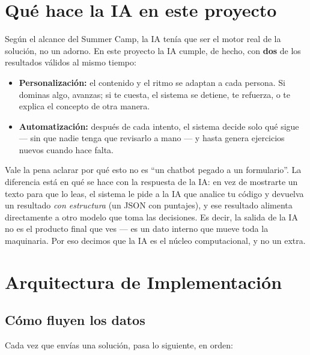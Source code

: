 \documentclass[11pt,letterpaper]{article}
\begin{document}
\newpage
\section{Qué hace la IA en este proyecto}

Según el alcance del Summer Camp, la IA tenía que ser el motor real de
la solución, no un adorno. En este proyecto la IA cumple, de hecho, con
\textbf{dos} de los resultados válidos al mismo tiempo:

\begin{itemize}[leftmargin=*]
  \item \textbf{Personalización:} el contenido y el ritmo se adaptan a
  cada persona. Si dominas algo, avanzas; si te cuesta, el sistema se
  detiene, te refuerza, o te explica el concepto de otra manera.
  \item \textbf{Automatización:} después de cada intento, el sistema
  decide solo qué sigue --- sin que nadie tenga que revisarlo a mano ---
  y hasta genera ejercicios nuevos cuando hace falta.
\end{itemize}

Vale la pena aclarar por qué esto no es ``un chatbot pegado a un
formulario''. La diferencia está en qué se hace con la respuesta de la
IA: en vez de mostrarte un texto para que lo leas, el sistema le pide a
la IA que analice tu código y devuelva un resultado \textit{con
estructura} (un JSON con puntajes), y ese resultado alimenta
directamente a otro modelo que toma las decisiones. Es decir, la salida
de la IA no es el producto final que ves --- es un dato interno que
mueve toda la maquinaria. Por eso decimos que la IA es el núcleo
computacional, y no un extra.

\section{Arquitectura de Implementación}

\subsection{Cómo fluyen los datos}
Cada vez que envías una solución, pasa lo siguiente, en orden:
\end{document}
